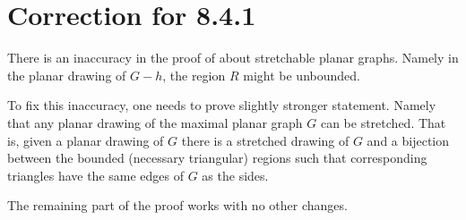 \chapter{Correction for 8.4.1}

There is an inaccuracy in the proof of \cite[Theorem 8.4.1]{pearls} about stretchable planar graphs.
Namely in the planar drawing of $G-h$, the region $R$ might be unbounded.

To fix this inaccuracy, one needs to prove slightly stronger statement.
Namely that any planar drawing of the maximal planar graph $G$ can be stretched.
That is, given a planar drawing of $G$ there is a stretched drawing of $G$ 
and a bijection between the bounded (necessary triangular) regions such that corresponding triangles have the same edges of $G$ as the sides.

The remaining part of the proof works with no other changes.
